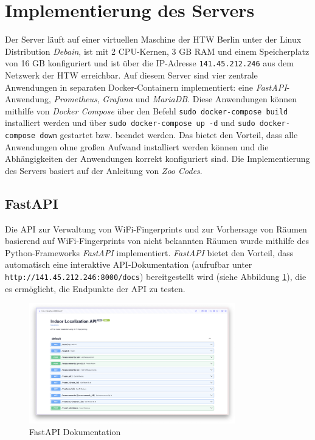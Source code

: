 \section{Implementierung des Servers} \label{api}


Der Server läuft auf einer virtuellen Maschine der HTW Berlin unter der Linux Distribution \textit{Debain}, ist mit 2 CPU-Kernen, 3 GB RAM und einem Speicherplatz von 16 GB konfiguriert und ist über die IP-Adresse \texttt{141.45.212.246} aus dem Netzwerk der HTW erreichbar. Auf diesem Server sind vier zentrale Anwendungen in separaten Docker-Containern implementiert: eine \textit{FastAPI}-Anwendung, \textit{Prometheus}, \textit{Grafana} und \textit{MariaDB}. Diese Anwendungen können mithilfe von \textit{Docker Compose} über den Befehl \texttt{sudo docker-compose build} installiert werden und über \texttt{sudo docker-compose up -d} und \texttt{sudo docker-compose down} gestartet bzw. beendet werden. Das bietet den Vorteil, dass alle Anwendungen ohne großen Aufwand installiert werden können und die Abhängigkeiten der Anwendungen korrekt konfiguriert sind. Die Implementierung des Servers basiert auf der Anleitung von \textit{Zoo Codes}.

\subsection{FastAPI} \label{section-fastapi}


Die API zur Verwaltung von WiFi-Fingerprints und zur Vorhersage von Räumen basierend auf WiFi-Fingerprints von nicht bekannten Räumen wurde mithilfe des Python-Frameworks \textit{FastAPI} implementiert. \textit{FastAPI} bietet den Vorteil, dass automatisch eine interaktive API-Dokumentation (aufrufbar unter \texttt{http://141.45.212.246:8000/docs}) bereitgestellt wird (siehe Abbildung \ref{fig:fast_api_screenshot}), die es ermöglicht, die Endpunkte der API zu testen.

\begin{figure}[h]
    \centering
    \includegraphics[width=0.8\textwidth]{images/screenshots/api_docs.png}
    \caption{FastAPI Dokumentation}
    \label{fig:fast_api_screenshot}
\end{figure}

